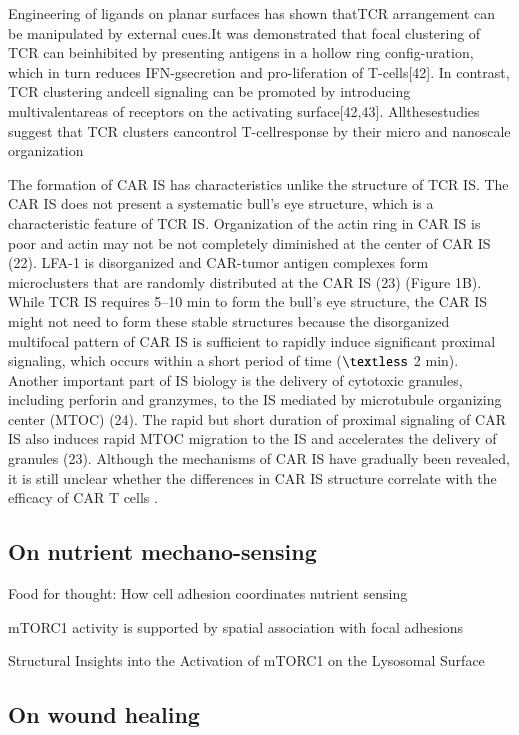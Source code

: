 Engineering of ligands on planar surfaces has shown thatTCR arrangement can be manipulated by external cues.It was demonstrated that focal clustering of TCR can beinhibited by presenting antigens in a hollow ring config-uration, which in turn reduces IFN-gsecretion and pro-liferation of T-cells[42]. In contrast, TCR clustering andcell signaling can be promoted by introducing multivalentareas of receptors on the activating surface[42,43]. Allthesestudies suggest that TCR clusters cancontrol T-cellresponse by their micro and nanoscale organization \cite{Aramesh2019}

The formation of CAR IS has characteristics unlike the structure of TCR IS. The CAR IS does not present a systematic bull's eye structure, which is a characteristic feature of TCR IS. Organization of the actin ring in CAR IS is poor and actin may not be not completely diminished at the center of CAR IS (22). LFA-1 is disorganized and CAR-tumor antigen complexes form microclusters that are randomly distributed at the CAR IS (23) (Figure 1B). While TCR IS requires 5–10 min to form the bull's eye structure, the CAR IS might not need to form these stable structures because the disorganized multifocal pattern of CAR IS is sufficient to rapidly induce significant proximal signaling, which occurs within a short period of time ($\textless$ 2 min). Another important part of IS biology is the delivery of cytotoxic granules, including perforin and granzymes, to the IS mediated by microtubule organizing center (MTOC) (24). The rapid but short duration of proximal signaling of CAR IS also induces rapid MTOC migration to the IS and accelerates the delivery of granules (23). Although the mechanisms of CAR IS have gradually been revealed, it is still unclear whether the differences in CAR IS structure correlate with the efficacy of CAR T cells \cite{Li2020, Watanabe2018}.


\subsection{On nutrient mechano-sensing}

Food for thought: How cell adhesion coordinates nutrient sensing

mTORC1 activity is supported by spatial association with focal adhesions

Structural Insights into the Activation of mTORC1 on the Lysosomal Surface

\subsection{On wound healing}

